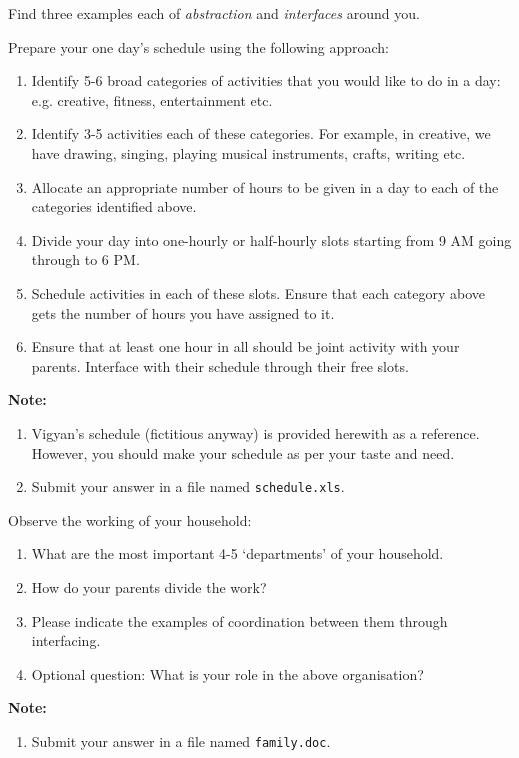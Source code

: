 \documentclass[addpoints,11pt]{exam}
\begin{document}
\begin{questions}

\question
Find three examples each of \emph{abstraction} and \emph{interfaces} around you.

\question
Prepare your one day's schedule using the following approach:
\begin{enumerate}
\item Identify 5-6 broad categories of activities that you would like to do in a day: e.g. creative, fitness, entertainment etc.
\item Identify 3-5 activities each of these categories. For example, in creative, we have drawing, singing, playing musical instruments, crafts, writing etc.
\item Allocate an appropriate number of hours to be given in a day to each of the categories identified above.
\item Divide your day into one-hourly or half-hourly slots starting from 9 AM going through to 6 PM.
\item Schedule activities in each of these slots. Ensure that each category above gets the number of hours you have assigned to it.
\item Ensure that at least one hour in all should be joint activity with your parents. Interface with their schedule through their free slots.
\end{enumerate}
\textbf{Note:}
\begin{enumerate}
\item Vigyan's schedule (fictitious anyway) is provided herewith as a reference. However, you should make your schedule as per your taste and need.
\item Submit your answer in a file named \texttt{schedule.xls}.
\end{enumerate}

\question
Observe the working of your household:
\begin{enumerate}
\item What are the most important 4-5 `departments' of your household.
\item How do your parents divide the work?
\item Please indicate the examples of coordination between them through interfacing.
\item Optional question: What is your role in the above organisation?
\end{enumerate}
\textbf{Note:}
\begin{enumerate}
\item Submit your answer in a file named \texttt{family.doc}.
\end{enumerate}


\end{questions}
\end{document}
